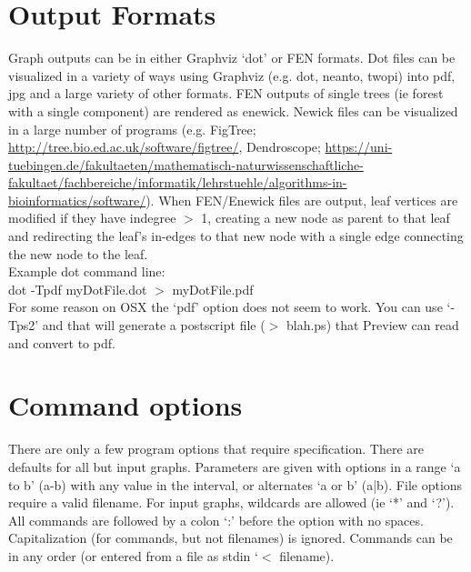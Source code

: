 \documentclass[11pt]{memoir}
\begin{document}
	\section{Output Formats}
	Graph outputs can be in either Graphviz `dot' or FEN formats.  Dot files can be visualized in a variety of ways 
	using Graphviz (e.g. dot, neanto, twopi) into pdf, jpg and a large variety of other formats. FEN outputs of 
	single trees (ie forest with a single component) are rendered as enewick.  Newick files can be visualized in a 
	large number of programs (e.g. FigTree; \url{http://tree.bio.ed.ac.uk/software/figtree/}, Dendroscope; 
	\url{https://uni-tuebingen.de/fakultaeten/mathematisch-naturwissenschaftliche-fakultaet/fachbereiche/informatik/lehrstuehle/algorithms-in-bioinformatics/software/}). 	
	When FEN/Enewick files are output, leaf vertices are modified if they have indegree $>$ 1, creating a new node as parent to that leaf
	and redirecting the leaf's in-edges to that new node with a single edge connecting the new node to the leaf.  
	\bigskip
	\\Example dot command line: \\dot -Tpdf myDotFile.dot $>$ myDotFile.pdf\\
	
	For some reason on OSX the `pdf' option does not seem to work.  You can use `-Tps2' and that will generate a postscript file ($>$ blah.ps) that Preview can read and convert to pdf.
	
	\section{Command options}
	There are only a few program options that require specification.  There are defaults for all but input graphs.  
	Parameters are given with options in a range `a to b' (a-b) with any value in the interval, or alternates `a or b' (a|b). File options require a valid filename.
	For input graphs, wildcards are allowed (ie `*' and `?').  All commands are followed by a colon `:' before the option with no spaces.  Capitalization (for commands, but not filenames) is ignored.  Commands can be in any order (or entered from a file as stdin `$<$ filename).
	
\end{document}
